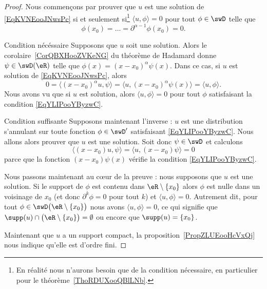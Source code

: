 \begin{proof}
    Nous commençons par prouver que \( u\) est une solution de \eqref{EqKVNEooJNwsPc} si et seulement si\footnote{En réalité nous n'aurons besoin que de la condition nécessaire, en particulier pour le théorème~\ref{ThoRDUXooQBlLNb}.} \( \langle u, \phi\rangle =0\) pour tout \( \phi\in\swD\) telle que
    \begin{equation}    \label{EqYLIPooYByzwC}
        \phi(x_0)=\ldots=\partial^{\alpha-1}\phi(x_0)=0.
    \end{equation}
    \begin{subproof}
    \item[Condition nécéssaire]
    Supposons que \( u\) soit une solution. Alors le corolaire~\ref{CorQBXHooZVKeNG} du théorème de Hadamard donne \( \psi\in\swD(\eR)\) telle que
        $\phi(x)=(x-x_0)^{\alpha}\psi(x)$.
    Dans ce cas, si \( u\) est solution de \eqref{EqKVNEooJNwsPc}, alors
    \begin{equation}
        0=\langle (x-x_0)^{\alpha}u, \psi\rangle =\langle u, (x-x_0)^{\alpha}\psi(x)\rangle =\langle u, \phi\rangle .
    \end{equation}
    Nous avons vu que si \( u\) est solution, alors \( \langle u, \phi\rangle =0\) pour tout \( \phi\) satisfaisant la condition \eqref{EqYLIPooYByzwC}.

\item[Condition suffisante]
    Supposons maintenant l'inverse : \( u\) est une distribution s'annulant sur toute fonction \( \phi\in\swD'\) satisfaisant \eqref{EqYLIPooYByzwC}. Nous allons alors prouver que \( u\) est une solution. Soit donc \( \psi\in \swD\) et calculons
    \begin{equation}
        \langle (x-x_0)u, \psi\rangle =\langle u, (x-x_0)\psi\rangle =0
    \end{equation}
    parce que la fonction \( (x-x_0)\psi(x)\) vérifie la condition \eqref{EqYLIPooYByzwC}.
    \end{subproof}

    Nous passons maintenant au cœur de la preuve : nous supposons que \( u\) est une solution. Si le support de \( \phi\) est contenu dans \( \eR\setminus\{ x_0 \}\) alors \( \phi\) est nulle dans un voisinage de \( x_0\) (et donc \( \partial^k\phi=0\) pour tout \( k\)) et \( \langle u, \phi\rangle =0\). Autrement dit, pour  tout \( \phi\in\swD\big( \eR\setminus\{ x_0 \} \big)\) nous avons \( \langle u, \phi\rangle =0\), ce qui signifie que \( \supp(u)\cap\big( \eR\setminus\{ x_0 \} \big)=\emptyset\) ou encore que \( \supp(u)=\{ x_0 \}\).

    Maintenant que \( u\) a un support compact, la proposition~\ref{PropZLUEooHcVxQj} nous indique qu'elle est d'ordre fini.
\end{proof}

